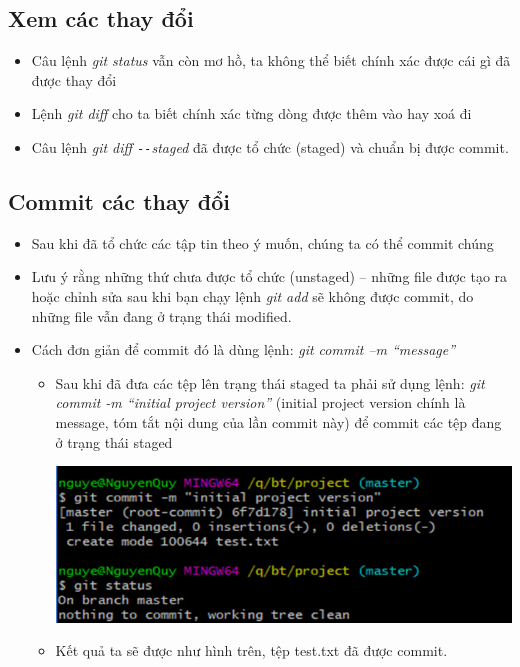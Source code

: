 \documentclass[12pt,a4paper]{report}
\begin{document}
\subsection{Xem các thay đổi} 
\begin{itemize}
\item Câu lệnh {\it git status} vẫn còn mơ hồ, ta không thể biết chính xác được cái gì đã được thay đổi
\item Lệnh {\it git diff} cho ta biết chính xác từng dòng được thêm vào hay xoá đi
\item Câu lệnh {\it git diff \texttt{-{}-}staged} đã được tổ chức (staged) và chuẩn bị được commit.
\end{itemize}
\subsection{Commit các thay đổi}
\begin{itemize}
\item Sau khi đã tổ chức các tập tin theo ý muốn, chúng ta có thể commit chúng
\item Lưu ý rằng những thứ chưa được tổ chức (unstaged) – những file được tạo ra hoặc chỉnh sửa sau khi bạn chạy lệnh \textit{git add} sẽ không được commit, do những file vẫn đang ở trạng thái modified.
\item Cách đơn giản để commit đó là dùng lệnh: {\it git commit –m “message”}
	\begin{itemize}
	\item Sau khi đã đưa các tệp lên trạng thái staged ta phải sử dụng lệnh: {\it git commit -m “initial project version”} (initial project version chính là message, tóm tắt nội dung của lần commit này) để commit các tệp đang ở trạng thái staged

	\includegraphics[width=0.8\linewidth]{screenshot012}

	\label{fig:screenshot012}

	\item Kết quả ta sẽ được như hình trên, tệp test.txt đã được commit.
\end{itemize}
\end{itemize}
\end{document}
